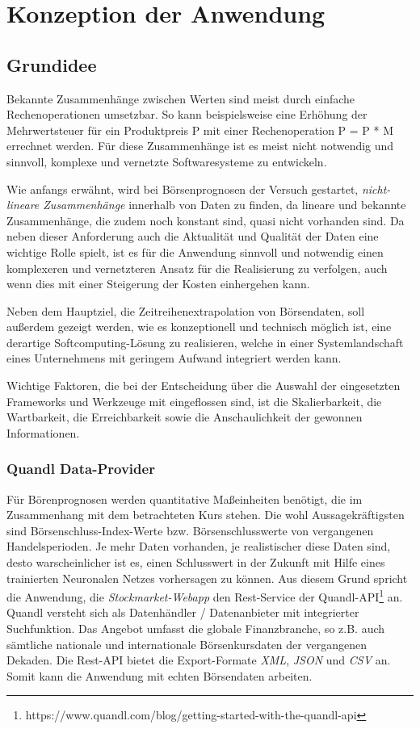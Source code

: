 \chapter{Konzeption der Anwendung}
\label{chapter:Konzeption der Anwendung}

\section{Grundidee} 
\label{subsection:Grundidee} 
Bekannte Zusammenhänge zwischen Werten sind meist durch einfache Rechenoperationen umsetzbar. So kann beispielsweise eine Erhöhung der Mehrwertsteuer für ein Produktpreis P mit einer Rechenoperation P = P * M errechnet werden. Für diese Zusammenhänge ist es meist nicht notwendig und sinnvoll, komplexe und vernetzte Softwaresysteme zu entwickeln. 

Wie anfangs erwähnt, wird bei Börsenprognosen der Versuch gestartet, \emph{nicht-lineare Zusammenhänge} innerhalb von Daten zu finden, da lineare und bekannte Zusammenhänge, die zudem noch konstant sind, quasi nicht vorhanden sind. Da neben dieser Anforderung auch die Aktualität und Qualität der Daten eine wichtige Rolle spielt, ist es für die Anwendung sinnvoll und notwendig einen komplexeren und vernetzteren Ansatz für die Realisierung zu verfolgen, auch wenn dies mit einer Steigerung der Kosten einhergehen kann. 

Neben dem Hauptziel, die Zeitreihenextrapolation von Börsendaten, soll außerdem gezeigt werden, wie es konzeptionell und technisch möglich ist, eine derartige Softcomputing-Lösung zu realisieren, welche in einer Systemlandschaft eines Unternehmens mit geringem Aufwand integriert werden kann.

Wichtige Faktoren, die bei der Entscheidung über die Auswahl der eingesetzten Frameworks und Werkzeuge mit eingeflossen sind, ist die Skalierbarkeit, die Wartbarkeit, die Erreichbarkeit sowie die Anschaulichkeit der gewonnen Informationen. 

\subsection{Quandl Data-Provider}
Für Börenprognosen werden quantitative Maßeinheiten benötigt, die im Zusammenhang mit dem betrachteten Kurs stehen. Die wohl Aussagekräftigsten sind Börsenschluss-Index-Werte bzw. Börsenschlusswerte von vergangenen Handelsperioden. Je mehr Daten vorhanden, je realistischer diese Daten sind, desto warscheinlicher ist es, einen Schlusswert in der Zukunft mit Hilfe eines trainierten Neuronalen Netzes vorhersagen zu können. 
Aus diesem Grund spricht die Anwendung, die \emph{Stockmarket-Webapp} den Rest-Service der Quandl-API\footnote[1]{https://www.quandl.com/blog/getting-started-with-the-quandl-api} an.  
Quandl versteht sich als Datenhändler / Datenanbieter mit integrierter Suchfunktion. Das Angebot umfasst die globale Finanzbranche, so z.B. auch sämtliche nationale und internationale Börsenkursdaten der vergangenen Dekaden. 
Die Rest-API bietet die Export-Formate \emph{XML}, \emph{JSON} und \emph{CSV} an.
Somit kann die Anwendung mit echten Börsendaten arbeiten. 


